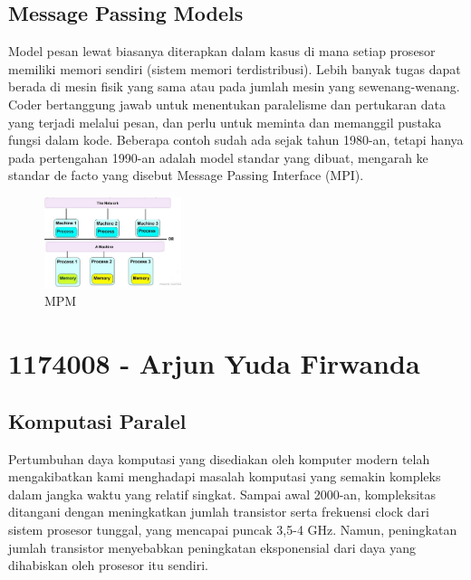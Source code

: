 \subsection{Message Passing Models}
\hfill\break
Model pesan lewat biasanya diterapkan dalam kasus di mana setiap prosesor memiliki memori sendiri (sistem memori terdistribusi). Lebih banyak tugas dapat berada di mesin fisik yang sama atau pada jumlah mesin yang sewenang-wenang. Coder bertanggung jawab untuk menentukan paralelisme dan pertukaran data yang terjadi melalui pesan, dan perlu untuk meminta dan memanggil pustaka fungsi dalam kode. Beberapa contoh sudah ada sejak tahun 1980-an, tetapi hanya pada pertengahan 1990-an adalah model standar yang dibuat, mengarah ke standar de facto yang disebut Message Passing Interface (MPI).
 \begin{figure}[H]
        \includegraphics[width=4cm]{figures/kelompok3/1/dwi4.PNG}
        \centering
        \caption{MPM}
\end{figure}


\section{1174008 - Arjun Yuda Firwanda}
\subsection{Komputasi Paralel}
\hfill\break
Pertumbuhan daya komputasi yang disediakan oleh komputer modern telah mengakibatkan kami menghadapi masalah komputasi yang semakin kompleks dalam jangka waktu yang relatif singkat. Sampai awal 2000-an, kompleksitas ditangani dengan meningkatkan jumlah transistor serta frekuensi clock dari sistem prosesor tunggal, yang mencapai puncak 3,5-4 GHz. Namun, peningkatan jumlah transistor menyebabkan peningkatan eksponensial dari daya yang dihabiskan oleh prosesor itu sendiri.

\hfill\break
